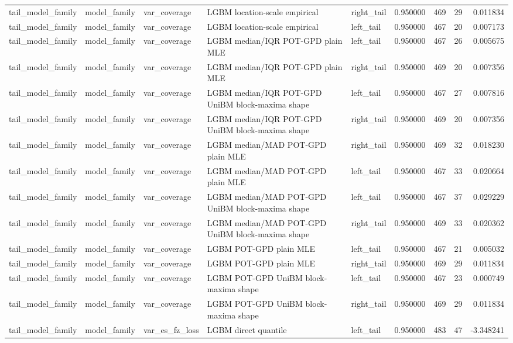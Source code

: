 \begin{tabular}{lllllrrrr}
tail\_model\_family & model\_family & var\_coverage & LGBM location-scale empirical & right\_tail & 0.950000 & 469 & 29 & 0.011834 \\
tail\_model\_family & model\_family & var\_coverage & LGBM location-scale empirical & left\_tail & 0.950000 & 467 & 20 & 0.007173 \\
tail\_model\_family & model\_family & var\_coverage & LGBM median/IQR POT-GPD plain MLE & left\_tail & 0.950000 & 467 & 26 & 0.005675 \\
tail\_model\_family & model\_family & var\_coverage & LGBM median/IQR POT-GPD plain MLE & right\_tail & 0.950000 & 469 & 20 & 0.007356 \\
tail\_model\_family & model\_family & var\_coverage & LGBM median/IQR POT-GPD UniBM block-maxima shape & left\_tail & 0.950000 & 467 & 27 & 0.007816 \\
tail\_model\_family & model\_family & var\_coverage & LGBM median/IQR POT-GPD UniBM block-maxima shape & right\_tail & 0.950000 & 469 & 20 & 0.007356 \\
tail\_model\_family & model\_family & var\_coverage & LGBM median/MAD POT-GPD plain MLE & right\_tail & 0.950000 & 469 & 32 & 0.018230 \\
tail\_model\_family & model\_family & var\_coverage & LGBM median/MAD POT-GPD plain MLE & left\_tail & 0.950000 & 467 & 33 & 0.020664 \\
tail\_model\_family & model\_family & var\_coverage & LGBM median/MAD POT-GPD UniBM block-maxima shape & left\_tail & 0.950000 & 467 & 37 & 0.029229 \\
tail\_model\_family & model\_family & var\_coverage & LGBM median/MAD POT-GPD UniBM block-maxima shape & right\_tail & 0.950000 & 469 & 33 & 0.020362 \\
tail\_model\_family & model\_family & var\_coverage & LGBM POT-GPD plain MLE & left\_tail & 0.950000 & 467 & 21 & 0.005032 \\
tail\_model\_family & model\_family & var\_coverage & LGBM POT-GPD plain MLE & right\_tail & 0.950000 & 469 & 29 & 0.011834 \\
tail\_model\_family & model\_family & var\_coverage & LGBM POT-GPD UniBM block-maxima shape & left\_tail & 0.950000 & 467 & 23 & 0.000749 \\
tail\_model\_family & model\_family & var\_coverage & LGBM POT-GPD UniBM block-maxima shape & right\_tail & 0.950000 & 469 & 29 & 0.011834 \\
tail\_model\_family & model\_family & var\_es\_fz\_loss & LGBM direct quantile & left\_tail & 0.950000 & 483 & 47 & -3.348241 \\

\end{tabular}
